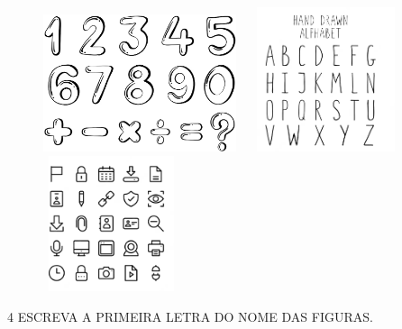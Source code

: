\begin{figure}[htpb!]
\includegraphics[width=2.23393in,height=1.58569in]{media/image6.png}
\includegraphics[width=1.96211in,height=1.66818in]{media/image7.png}
\includegraphics[width=1.56875in,height=1.56875in]{media/image8.png}
\end{figure}



\pagebreak
\num{4} ESCREVA A PRIMEIRA LETRA DO NOME DAS FIGURAS.\bigskip


